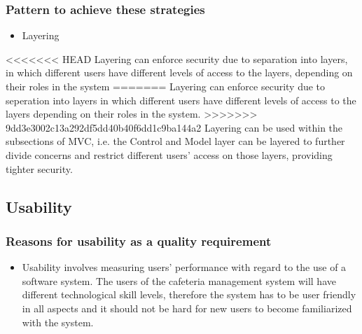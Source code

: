 \documentclass[a4paper,12pt]{article}
\begin{document}
\subsubsection{Pattern to achieve these strategies}
\begin{itemize}
 \item Layering
\end{itemize}
<<<<<<< HEAD
Layering can enforce security due to separation into layers, in which different users have different levels of access to the layers, depending on their roles in the system
=======
Layering can enforce security due to seperation into layers in which different users have different levels of access to the layers depending on their roles in the system.
>>>>>>> 9dd3e3002c13a292df5dd40b40f6dd1c9ba144a2
Layering can be used within the subsections of MVC, i.e. the Control and Model layer can be layered to further divide concerns and restrict different users' access on those layers, providing tighter security.

\subsection{Usability}

 \subsubsection{Reasons for usability as a quality requirement}
 \begin{itemize}
 \item Usability involves measuring users' performance with regard to the use of a software system. The users of the cafeteria management system will have different technological skill levels, therefore the system has to be user friendly in all aspects and it should not be hard for new users to become familiarized with the system.

 \end{itemize}
\end{document}
